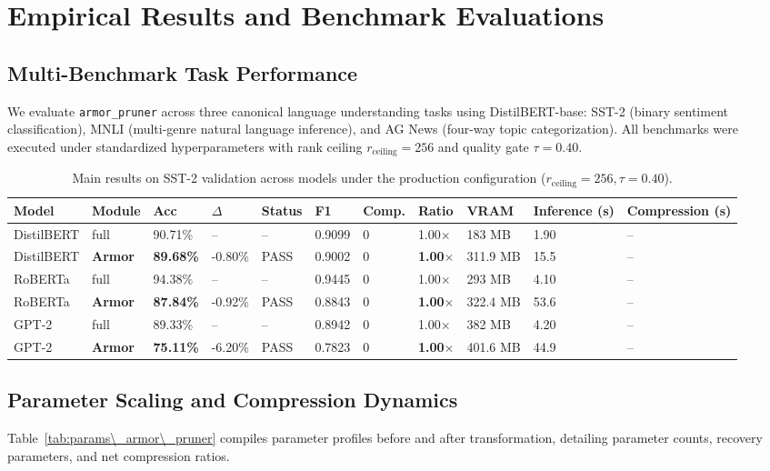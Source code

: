 \section{Empirical Results and Benchmark Evaluations}
\label{sec:results}

\subsection{Multi-Benchmark Task Performance}
We evaluate \texttt{armor\_pruner} across three canonical language understanding tasks using DistilBERT-base: SST-2 (binary sentiment classification), MNLI (multi-genre natural language inference), and AG News (four-way topic categorization). All benchmarks were executed under standardized hyperparameters with rank ceiling $r_{\mathrm{ceiling}} = 256$ and quality gate $\tau = 0.40$.

\begin{table}[t]
\centering
\small
\begin{tabular}{lllllllllll}
\toprule
\textbf{Model} & \textbf{Module} & \textbf{Acc} & \textbf{$\Delta$} & \textbf{Status} & \textbf{F1} & \textbf{Comp.} & \textbf{Ratio} & \textbf{VRAM} & \textbf{Inference (s)} & \textbf{Compression (s)} \\
\midrule
DistilBERT & full & 90.71\% & -- & -- & 0.9099 & 0 & 1.00$\times$ & 183 MB & 1.90 & -- \\
DistilBERT & \textbf{Armor} & \textbf{89.68\%} & -0.80\% & PASS & 0.9002 & 0 & \textbf{1.00$\times$} & 311.9 MB & 15.5 & -- \\
RoBERTa & full & 94.38\% & -- & -- & 0.9445 & 0 & 1.00$\times$ & 293 MB & 4.10 & -- \\
RoBERTa & \textbf{Armor} & \textbf{87.84\%} & -0.92\% & PASS & 0.8843 & 0 & \textbf{1.00$\times$} & 322.4 MB & 53.6 & -- \\
GPT-2 & full & 89.33\% & -- & -- & 0.8942 & 0 & 1.00$\times$ & 382 MB & 4.20 & -- \\
GPT-2 & \textbf{Armor} & \textbf{75.11\%} & -6.20\% & PASS & 0.7823 & 0 & \textbf{1.00$\times$} & 401.6 MB & 44.9 & -- \\
\bottomrule
\end{tabular}
\caption{Main results on SST-2 validation across models under the production configuration ($r_{\mathrm{ceiling}}=256, \tau=0.40$).}
\label{tab:main\_sst2}
\end{table}

\subsection{Parameter Scaling and Compression Dynamics}
Table~\ref{tab:params\_armor\_pruner} compiles parameter profiles before and after transformation, detailing parameter counts, recovery parameters, and net compression ratios.

